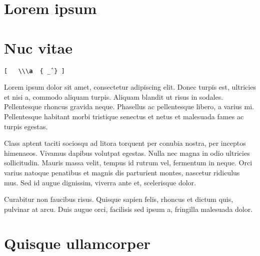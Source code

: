 \documentclass{article}
\begin{document}
\section{Lorem ipsum}

\Blindtext[2][1]

\section{Nuc vitae}

\texttt{[~~~\textbackslash\textbackslash\textbackslash \textbf{a}~~\{ \^ \_ \} ]}

Lorem ipsum dolor sit amet, consectetur adipiscing elit. Donec turpis est, ultricies et nisi a, commodo aliquam turpis. Aliquam blandit ut risus in sodales. Pellentesque rhoncus gravida neque. Phasellus ac pellentesque libero, a varius mi. Pellentesque habitant morbi tristique senectus et netus et malesuada fames ac turpis egestas.

Class aptent taciti sociosqu ad litora torquent per conubia nostra, per inceptos himenaeos. Vivamus dapibus volutpat egestas. Nulla nec magna in odio ultricies sollicitudin. Mauris massa velit, tempus id rutrum vel, fermentum in neque. Orci varius natoque penatibus et magnis dis parturient montes, nascetur ridiculus mus. Sed id augue dignissim, viverra ante et, scelerisque dolor.

Curabitur non faucibus risus. Quisque sapien felis, rhoncus et dictum quis, pulvinar at arcu. Duis augue orci, facilisis sed ipsum a, fringilla malesuada dolor.

\section{Quisque ullamcorper}

\Blindtext[3][1]
\end{document}
